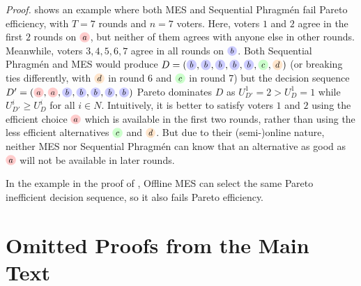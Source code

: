 \documentclass[10pt]{scrartcl}
\theoremstyle{plain}
\theoremstyle{definition}
\renewcommand*{\ge}{\geqslant}
\newcommand{\alternativea}{\tikz[baseline=-3pt,transform shape,scale=0.85]{\node[text height=6pt,inner sep=1pt,fill=red!20,    circle,minimum width=12pt] (x) {$a$};}}
\newcommand{\alternativeb}{\tikz[baseline=-3pt,transform shape,scale=0.85]{\node[text height=6pt,inner sep=1pt,fill=blue!20,   circle,minimum width=12pt] (x) {$b$};}}
\newcommand{\alternativec}{\tikz[baseline=-3pt,transform shape,scale=0.85]{\node[text height=6pt,inner sep=1pt,fill=green!20,  circle,minimum width=12pt] (x) {$c$};}}
\newcommand{\alternatived}{\tikz[baseline=-3pt,transform shape,scale=0.85]{\node[text height=6pt,inner sep=1pt,fill=orange!20, circle,minimum width=12pt] (x) {$d$};}}
\begin{document}
\noindent
\emph{Proof.} 
 shows an example where both MES and Sequential Phragm\'en fail Pareto efficiency, with $T = 7$ rounds and $n = 7$ voters. Here, voters $1$ and $2$ agree in the first $2$ rounds on $\alternativea$, but neither of them agrees with anyone else in other rounds. Meanwhile, voters $3, 4, 5, 6, 7$ agree in all rounds on $\alternativeb$. 
Both Sequential Phragm\'en and MES would produce $D = (\alternativeb, \alternativeb, \alternativeb, \alternativeb, \alternativeb, \alternativec, \alternatived)$ (or breaking ties differently, with $\alternatived$ in round 6 and $\alternativec$ in round 7) but the decision sequence $D' = (\alternativea, \alternativea, \alternativeb, \alternativeb, \alternativeb, \alternativeb, \alternativeb)$ Pareto dominates $D$ as $U^1_{D'} = 2 > U^1_D = 1$ while $U^i_{D'} \ge U^i_D$ for all $i \in N$. Intuitively, it is better to satisfy voters $1$ and $2$ using the efficient choice $\alternativea$ which is available in the first two rounds, rather than using the less efficient alternatives $\alternativec$ and $\alternatived$. But due to their (semi-)online nature, neither MES nor Sequential Phragm\'en can know that an alternative as good as $\alternativea$ will not be available in later rounds. \hfill \qedsymbol

\medskip
In the example in the proof of , Offline MES can select the same Pareto inefficient decision sequence, so it also fails Pareto efficiency.



 
\section{Omitted Proofs from the Main Text}


\iffalse 
\end{document}
